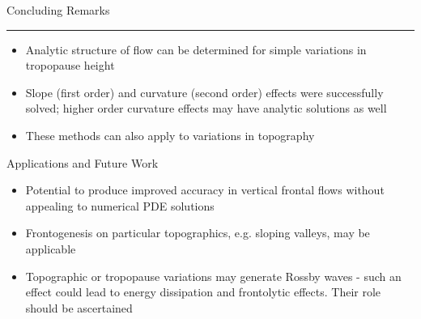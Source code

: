 \documentclass[landscape]{seminar}
\begin{document}
\begin{slide}

\begin{center}
{\color{darkblue} \large Concluding Remarks \\ \rule[0.15in]{\textwidth}{.03in}}
\end{center}

\begin{itemize}
\item Analytic structure of flow can be determined for simple variations in tropopause height

\item Slope (first order) and curvature (second order) effects were successfully solved; higher order curvature effects may have analytic solutions as well

\item These methods can also apply to variations in topography
\end{itemize}

\end{slide}
\begin{slide}

\begin{center}
{\color{darkblue} \large Applications and Future Work}
\end{center}

\begin{itemize}
\item Potential to produce improved accuracy in vertical frontal flows without appealing to numerical PDE solutions

\item Frontogenesis on particular topographics, e.g. sloping valleys, may be applicable

\item Topographic or tropopause variations may generate Rossby waves - such an effect could lead to energy dissipation and frontolytic effects. Their role should be ascertained
\end{itemize}

\end{slide}
\end{document}
